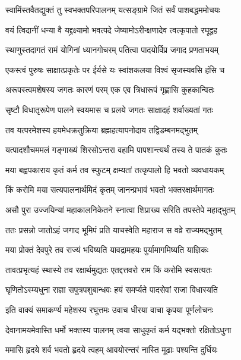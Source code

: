 \twolineshloka
{स्वामिंस्तवैतद्युक्तं तु स्वभक्तपरिपालनम्}
{यत्सङ्ग्रामे जितं सर्वं पाशबद्धममोचयः}%

\twolineshloka
{वयं त्विदानीं धन्या वै यद्द्रक्ष्यामो भवत्पदे}
{जेष्यामोऽरीन्क्षणादेव त्वत्कृपातो रघूद्वह}%


\twolineshloka
{स्थाणुस्तदागतं रामं योगिनां ध्यानगोचरम्}
{पतित्वा पादयोर्विप्र जगाद प्रणताभयम्}%

\twolineshloka
{एकस्त्वं पुरुषः साक्षात्प्रकृतेः पर ईर्यसे}
{यः स्वांशकलया विश्वं सृजस्यवसि हंसि च}%

\twolineshloka
{अरूपस्त्वमशेषस्य जगतः कारणं परम्}
{एक एव त्रिधारूपं गृह्णासि कुहकान्वितः}%

\twolineshloka
{सृष्टौ विधातृरूपेण पालने स्वयमास च}
{प्रलये जगतः साक्षादहं शर्वाख्यतां गतः}%

\twolineshloka
{तव यत्परमेशस्य हयमेधक्रतुक्रिया}
{ब्रह्महत्यापनोदाय तद्विडम्बनमद्भुतम्}%

\twolineshloka
{यत्पादशौचममलं गङ्गाख्यं शिरसोऽन्तरा}
{वहामि पापशान्त्यर्थं तस्य ते पातकं कुतः}%

\twolineshloka
{मया बह्वपकाराय कृतं कर्म तव स्फुटम्}
{क्षम्यतां तत्कृपालो हि भवतो व्यवधायकम्}%

\twolineshloka
{किं करोमि मया सत्यपालनार्थमिदं कृतम्}
{जानन्प्रभावं भवतो भक्तरक्षार्थमागतः}%

\twolineshloka
{असौ पुरा उज्जयिन्यां महाकालनिकेतने}
{स्नात्वा शिप्राख्य सरिति तपस्तेपे महाद्भुतम्}%

\twolineshloka
{ततः प्रसन्नो जातोऽहं जगाद भूमिपं प्रति}
{याचस्वेति महाराज स वव्रे राज्यमद्भुतम्}%

\twolineshloka
{मया प्रोक्तं देवपुरे तव राज्यं भविष्यति}
{यावद्रामहयः पुर्यामागमिष्यति याज्ञिकः}%

\twolineshloka
{तावत्प्रभृत्यहं स्थास्ये तव रक्षार्थमुद्यतः}
{एतद्दत्तवरो राम किं करोमि स्वसत्यतः}%

\twolineshloka
{घृणितोऽस्म्यधुना राज्ञा सपुत्रपशुबान्धवः}
{हयं समर्प्यते पादसेवां राजा विधास्यति}%


\twolineshloka
{इति वाक्यं समाकर्ण्य महेशस्य रघूत्तमः}
{उवाच धीरया वाचा कृपया पूर्णलोचनः}%


\twolineshloka
{देवानामयमेवास्ति धर्मो भक्तस्य पालनम्}
{त्वया साधुकृतं कर्म यद्भक्तो रक्षितोऽधुना}%

\twolineshloka
{ममासि हृदये शर्व भवतो हृदये त्वहम्}
{आवयोरन्तरं नास्ति मूढाः पश्यन्ति दुर्धियः}%


